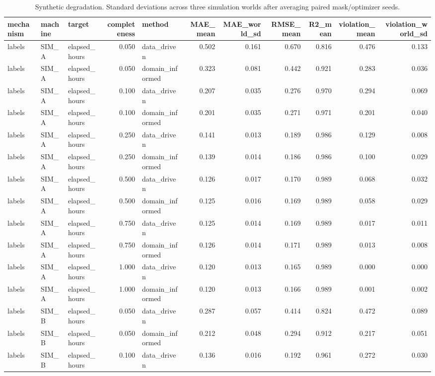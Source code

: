 \begin{table}
\caption{Synthetic degradation. Standard deviations across three simulation worlds after averaging paired mask/optimizer seeds.}
\begin{tabular}{lllrlrrrrrr}
\toprule
mechanism & machine & target & completeness & method & MAE\_mean & MAE\_world\_sd & RMSE\_mean & R2\_mean & violation\_mean & violation\_world\_sd \\
\midrule
labels & SIM\_A & elapsed\_hours & 0.050 & data\_driven & 0.502 & 0.161 & 0.670 & 0.816 & 0.476 & 0.133 \\
labels & SIM\_A & elapsed\_hours & 0.050 & domain\_informed & 0.323 & 0.081 & 0.442 & 0.921 & 0.283 & 0.036 \\
labels & SIM\_A & elapsed\_hours & 0.100 & data\_driven & 0.207 & 0.035 & 0.276 & 0.970 & 0.294 & 0.069 \\
labels & SIM\_A & elapsed\_hours & 0.100 & domain\_informed & 0.201 & 0.035 & 0.271 & 0.971 & 0.201 & 0.040 \\
labels & SIM\_A & elapsed\_hours & 0.250 & data\_driven & 0.141 & 0.013 & 0.189 & 0.986 & 0.129 & 0.008 \\
labels & SIM\_A & elapsed\_hours & 0.250 & domain\_informed & 0.139 & 0.014 & 0.186 & 0.986 & 0.100 & 0.029 \\
labels & SIM\_A & elapsed\_hours & 0.500 & data\_driven & 0.126 & 0.017 & 0.170 & 0.989 & 0.068 & 0.032 \\
labels & SIM\_A & elapsed\_hours & 0.500 & domain\_informed & 0.125 & 0.016 & 0.169 & 0.989 & 0.058 & 0.029 \\
labels & SIM\_A & elapsed\_hours & 0.750 & data\_driven & 0.125 & 0.014 & 0.169 & 0.989 & 0.017 & 0.011 \\
labels & SIM\_A & elapsed\_hours & 0.750 & domain\_informed & 0.126 & 0.014 & 0.171 & 0.989 & 0.013 & 0.008 \\
labels & SIM\_A & elapsed\_hours & 1.000 & data\_driven & 0.120 & 0.013 & 0.165 & 0.989 & 0.000 & 0.000 \\
labels & SIM\_A & elapsed\_hours & 1.000 & domain\_informed & 0.120 & 0.013 & 0.166 & 0.989 & 0.001 & 0.002 \\
labels & SIM\_B & elapsed\_hours & 0.050 & data\_driven & 0.287 & 0.057 & 0.414 & 0.824 & 0.472 & 0.089 \\
labels & SIM\_B & elapsed\_hours & 0.050 & domain\_informed & 0.212 & 0.048 & 0.294 & 0.912 & 0.217 & 0.051 \\
labels & SIM\_B & elapsed\_hours & 0.100 & data\_driven & 0.136 & 0.016 & 0.192 & 0.961 & 0.272 & 0.030 \\

\end{tabular}
\end{table}
